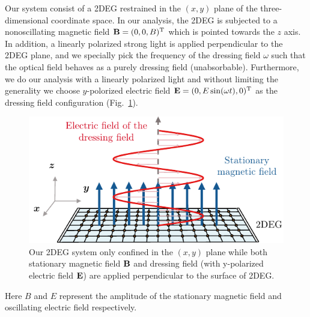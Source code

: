 
Our system consist of a 2DEG restrained in the $(x,y)$ plane of the three-dimensional coordinate space. In our analysis, the 2DEG is subjected to a nonoscillating magnetic field $\vb{B} = (0,0,B)^{\text{T}}$ which is pointed towards the $z$ axis. In addition, a linearly polarized strong light is applied perpendicular to the 2DEG plane, and we specially pick the frequency of the dressing field $\omega$ such that the optical field behaves as a purely dressing field (unabsorbable). Furthermore, we do our analysis with a linearly polarized light and without limiting the generality we choose $y$-polorized electric field $\vb{E} = (0,E\sin(\omega t),0)^{\text{T}}$ as the dressing field configuration (Fig.~\ref{fig_1}).
\begin{figure}[b]
\includegraphics[scale=0.9]{figures/fig_1}
\caption{\label{fig_1} Our 2DEG system only confined in the $(x,y)$ plane while both stationary magnetic field $\vb{B}$ and dressing field (with y-polarized electric field $\vb{E}$) are applied perpendicular to the surface of 2DEG.}
\end{figure}
Here $B$ and $E$ represent the amplitude of the stationary magnetic field and oscillating electric field respectively.

